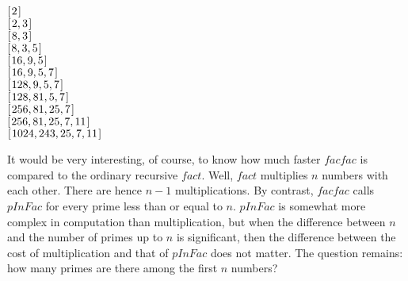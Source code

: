 \documentclass{scrreprt}
\newcommand{\Varid}[1]{\mathit{#1}}
\begin{document}
\begin{minipage}{\textwidth}
\ensuremath{[\mskip1.5mu \mathrm{2}\mskip1.5mu]}\\
\ensuremath{[\mskip1.5mu \mathrm{2},\mathrm{3}\mskip1.5mu]}\\
\ensuremath{[\mskip1.5mu \mathrm{8},\mathrm{3}\mskip1.5mu]}\\
\ensuremath{[\mskip1.5mu \mathrm{8},\mathrm{3},\mathrm{5}\mskip1.5mu]}\\
\ensuremath{[\mskip1.5mu \mathrm{16},\mathrm{9},\mathrm{5}\mskip1.5mu]}\\
\ensuremath{[\mskip1.5mu \mathrm{16},\mathrm{9},\mathrm{5},\mathrm{7}\mskip1.5mu]}\\
\ensuremath{[\mskip1.5mu \mathrm{128},\mathrm{9},\mathrm{5},\mathrm{7}\mskip1.5mu]}\\
\ensuremath{[\mskip1.5mu \mathrm{128},\mathrm{81},\mathrm{5},\mathrm{7}\mskip1.5mu]}\\
\ensuremath{[\mskip1.5mu \mathrm{256},\mathrm{81},\mathrm{25},\mathrm{7}\mskip1.5mu]}\\
\ensuremath{[\mskip1.5mu \mathrm{256},\mathrm{81},\mathrm{25},\mathrm{7},\mathrm{11}\mskip1.5mu]}\\
\ensuremath{[\mskip1.5mu \mathrm{1024},\mathrm{243},\mathrm{25},\mathrm{7},\mathrm{11}\mskip1.5mu]}
\end{minipage}

It would be very interesting, of course,
to know how much faster \ensuremath{\Varid{facfac}} is compared
to the ordinary recursive \ensuremath{\Varid{fact}}.
Well, \ensuremath{\Varid{fact}} multiplies $n$ numbers with each other.
There are hence $n-1$ multiplications.
By contrast, \ensuremath{\Varid{facfac}} calls \ensuremath{\Varid{pInFac}} for every prime 
less than or equal to $n$. \ensuremath{\Varid{pInFac}} is somewhat more complex
in computation than multiplication,
but when the difference between $n$ 
and the number of primes up to $n$ is significant,
then the difference between the cost of multiplication
and that of \ensuremath{\Varid{pInFac}} does not matter.
The question remains: how many primes are there
among the first $n$ numbers?
 
\end{document}
